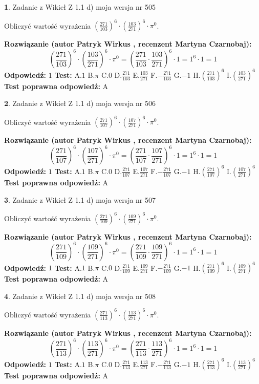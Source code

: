\documentclass[12pt, a4paper]{article}
\theoremstyle{definition} %
\newtheorem{zad}{}
\newcommand{\zadStart}[1]{\begin{zad}#1\newline}
\newcommand{\zadStop}{\end{zad}}
\newcommand{\rozwStart}[2]{\noindent \textbf{Rozwiązanie (autor #1 , recenzent #2): }\newline}
\newcommand{\rozwStop}{\newline}
\newcommand{\odpStart}{\noindent \textbf{Odpowiedź:}\newline}
\newcommand{\odpStop}{\newline}
\newcommand{\testStart}{\noindent \textbf{Test:}\newline}
\newcommand{\testStop}{\newline}
\newcommand{\kluczStart}{\noindent \textbf{Test poprawna odpowiedź:}\newline}
\newcommand{\kluczStop}{\newline}
\begin{document}
\zadStart{Zadanie z Wikieł Z 1.1 d) moja wersja nr 505}

Obliczyć wartość wyrażenia $(\frac{271}{103})^{6} \cdot (\frac{103}{271})^{6} \cdot \pi^{0}$.
\zadStop
\rozwStart{Patryk Wirkus}{Martyna Czarnobaj}
$$(\frac{271}{103})^{6} \cdot (\frac{103}{271})^{6} \cdot \pi^{0} = (\frac{271}{103} \cdot \frac{103}{271})^{6} \cdot 1 = 1^{6} \cdot 1 = 1$$
\rozwStop
\odpStart
$1$
\odpStop
\testStart
A.$1$ B.$\pi$ C.$0$ D.$\frac{271}{103}$ E.$\frac{103}{271}$
F.$-\frac{271}{103}$ G.$-1$
H.$(\frac{271}{103})^{6}$
I.$(\frac{103}{271})^{6}$
\testStop
\kluczStart
A
\kluczStop



\zadStart{Zadanie z Wikieł Z 1.1 d) moja wersja nr 506}

Obliczyć wartość wyrażenia $(\frac{271}{107})^{6} \cdot (\frac{107}{271})^{6} \cdot \pi^{0}$.
\zadStop
\rozwStart{Patryk Wirkus}{Martyna Czarnobaj}
$$(\frac{271}{107})^{6} \cdot (\frac{107}{271})^{6} \cdot \pi^{0} = (\frac{271}{107} \cdot \frac{107}{271})^{6} \cdot 1 = 1^{6} \cdot 1 = 1$$
\rozwStop
\odpStart
$1$
\odpStop
\testStart
A.$1$ B.$\pi$ C.$0$ D.$\frac{271}{107}$ E.$\frac{107}{271}$
F.$-\frac{271}{107}$ G.$-1$
H.$(\frac{271}{107})^{6}$
I.$(\frac{107}{271})^{6}$
\testStop
\kluczStart
A
\kluczStop



\zadStart{Zadanie z Wikieł Z 1.1 d) moja wersja nr 507}

Obliczyć wartość wyrażenia $(\frac{271}{109})^{6} \cdot (\frac{109}{271})^{6} \cdot \pi^{0}$.
\zadStop
\rozwStart{Patryk Wirkus}{Martyna Czarnobaj}
$$(\frac{271}{109})^{6} \cdot (\frac{109}{271})^{6} \cdot \pi^{0} = (\frac{271}{109} \cdot \frac{109}{271})^{6} \cdot 1 = 1^{6} \cdot 1 = 1$$
\rozwStop
\odpStart
$1$
\odpStop
\testStart
A.$1$ B.$\pi$ C.$0$ D.$\frac{271}{109}$ E.$\frac{109}{271}$
F.$-\frac{271}{109}$ G.$-1$
H.$(\frac{271}{109})^{6}$
I.$(\frac{109}{271})^{6}$
\testStop
\kluczStart
A
\kluczStop



\zadStart{Zadanie z Wikieł Z 1.1 d) moja wersja nr 508}

Obliczyć wartość wyrażenia $(\frac{271}{113})^{6} \cdot (\frac{113}{271})^{6} \cdot \pi^{0}$.
\zadStop
\rozwStart{Patryk Wirkus}{Martyna Czarnobaj}
$$(\frac{271}{113})^{6} \cdot (\frac{113}{271})^{6} \cdot \pi^{0} = (\frac{271}{113} \cdot \frac{113}{271})^{6} \cdot 1 = 1^{6} \cdot 1 = 1$$
\rozwStop
\odpStart
$1$
\odpStop
\testStart
A.$1$ B.$\pi$ C.$0$ D.$\frac{271}{113}$ E.$\frac{113}{271}$
F.$-\frac{271}{113}$ G.$-1$
H.$(\frac{271}{113})^{6}$
I.$(\frac{113}{271})^{6}$
\testStop
\kluczStart
A
\kluczStop
\end{document}
